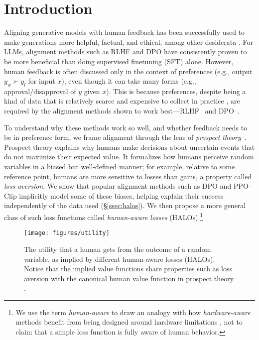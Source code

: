 \section{Introduction}

Aligning generative models with human feedback has been successfully used to make generations more helpful, factual, and ethical, among other desiderata \citep{ouyang2022training,tian2023fine}.
For LLMs, alignment methods such as RLHF and DPO have consistently proven to be more beneficial than doing supervised finetuning (SFT) alone. 
However, human feedback is often discussed only in the context of preferences (e.g., output $y_w \succ y_l$ for input $x$), even though it can take many forms (e.g., approval/disapproval of $y$ given $x$).
This is because preferences, despite being a kind of data that is relatively scarce and expensive to collect in practice \citep{casper2023open}, are required by the alignment methods shown to work best---RLHF~\citep{christiano2017deep} and DPO~\citep{rafailov2023direct}.

To understand why these methods work so well, and whether feedback needs to be in preference form, we frame alignment through the lens of \textit{prospect theory}~\cite{kahneman1979prospect,tversky1992advances}.
Prospect theory explains why humans make decisions about uncertain events that do not maximize their expected value.
It formalizes how humans perceive random variables in a biased but well-defined manner; for example, relative to some reference point, humans are more sensitive to losses than gains, a property called \textit{loss aversion}.
We show that popular alignment methods such as DPO and PPO-Clip \citep{schulman2017proximal} implicitly model some of these biases, helping explain their success independently of the data used (\S\ref{ssec:halos}).
We then propose a more general class of such loss functions called \textit{human-aware losses} (HALOs).\footnote{We use the term \emph{human-aware} to draw an analogy with how \emph{hardware-aware} methods benefit from being designed around hardware limitations \citep{dao2022flashattention}, not to claim that a simple loss function is fully aware of human behavior.}

\begin{figure}
    \centering
    \texttt{[image: figures/utility]}
    \vspace{-5pt}
    \caption{The utility that a human gets from the outcome of a random variable, as implied by different human-aware losses (HALOs).
    Notice that the implied value functions share properties such as loss aversion with the canonical human value function in prospect theory \citep{tversky1992advances}.
     }
    \label{fig:utility}
\end{figure}

